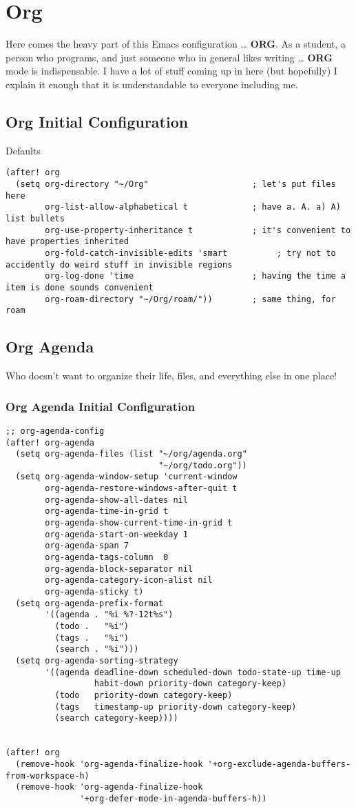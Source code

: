 \documentclass[11pt]{article}
\begin{document}
\section{Org}
\label{sec:org90946bb}
Here comes the heavy part of this Emacs configuration \ldots{} \textbf{ORG}. As a student, a person who programs, and just someone who in general likes writing \ldots{} \textbf{ORG} mode is indispensable. I have a lot of stuff coming up in here (but hopefully) I explain it enough that it is understandable to everyone including me.
\subsection{Org Initial Configuration}
\label{sec:org6e03330}
Defaults
\begin{verbatim}
(after! org
  (setq org-directory "~/Org"                     ; let's put files here
        org-list-allow-alphabetical t             ; have a. A. a) A) list bullets
        org-use-property-inheritance t            ; it's convenient to have properties inherited
        org-fold-catch-invisible-edits 'smart          ; try not to accidently do weird stuff in invisible regions
        org-log-done 'time                        ; having the time a item is done sounds convenient
        org-roam-directory "~/Org/roam/"))        ; same thing, for roam
\end{verbatim}
\subsection{Org Agenda}
\label{sec:org466e423}
Who doesn't want to organize their life, files, and everything else in one place!
\subsubsection{Org Agenda Initial Configuration}
\label{sec:org3c7ae1b}
\begin{verbatim}
;; org-agenda-config
(after! org-agenda
  (setq org-agenda-files (list "~/org/agenda.org"
                               "~/org/todo.org"))
  (setq org-agenda-window-setup 'current-window
        org-agenda-restore-windows-after-quit t
        org-agenda-show-all-dates nil
        org-agenda-time-in-grid t
        org-agenda-show-current-time-in-grid t
        org-agenda-start-on-weekday 1
        org-agenda-span 7
        org-agenda-tags-column  0
        org-agenda-block-separator nil
        org-agenda-category-icon-alist nil
        org-agenda-sticky t)
  (setq org-agenda-prefix-format
        '((agenda . "%i %?-12t%s")
          (todo .   "%i")
          (tags .   "%i")
          (search . "%i")))
  (setq org-agenda-sorting-strategy
        '((agenda deadline-down scheduled-down todo-state-up time-up
                  habit-down priority-down category-keep)
          (todo   priority-down category-keep)
          (tags   timestamp-up priority-down category-keep)
          (search category-keep))))


(after! org
  (remove-hook 'org-agenda-finalize-hook '+org-exclude-agenda-buffers-from-workspace-h)
  (remove-hook 'org-agenda-finalize-hook
               '+org-defer-mode-in-agenda-buffers-h))
\end{verbatim}
\end{document}
